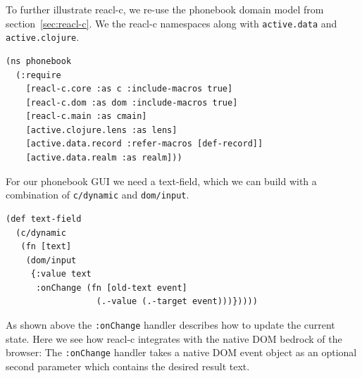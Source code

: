 \documentclass[sigplan,review,screen]{acmart}
\begin{document}
To further illustrate reacl-c, we re-use the phonebook domain model 
from section~\ref{sec:reacl-c}.  We the reacl-c namespaces along with
\texttt{active.data} and \texttt{active.clojure}.
%
\begin{verbatim}
(ns phonebook
  (:require
    [reacl-c.core :as c :include-macros true]
    [reacl-c.dom :as dom :include-macros true]
    [reacl-c.main :as cmain]
    [active.clojure.lens :as lens]
    [active.data.record :refer-macros [def-record]]
    [active.data.realm :as realm]))
\end{verbatim}
%
For our phonebook GUI we need a text-field, which we can build
with a combination of \texttt{c/dynamic} and \texttt{dom/input}.
%
\begin{verbatim}
(def text-field
  (c/dynamic
   (fn [text]
    (dom/input
     {:value text
      :onChange (fn [old-text event]
                  (.-value (.-target event)))}))))
\end{verbatim}
%
As shown above the \texttt{:onChange} handler describes how to update
the current state.  Here we see how reacl-c integrates with the native
DOM bedrock of the browser: The \texttt{:onChange} handler takes a
native DOM event object as an optional second
parameter which contains the desired result text.
\end{document}
